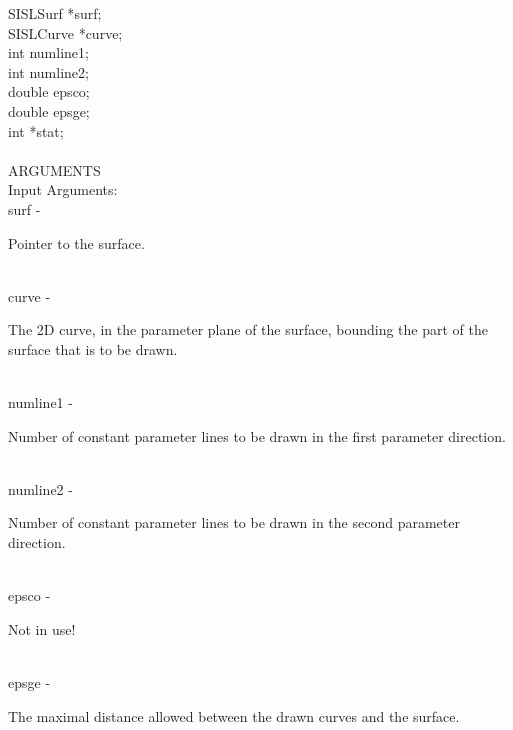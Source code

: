                \>\>    SISLSurf        \>      *{\fov surf};\\
                \>\>    SISLCurve       \>      *{\fov curve};\\
                \>\>    int     \>      {\fov numline1};\\
                \>\>    int     \>      {\fov numline2};\\
                \>\>    double  \>      {\fov epsco};\\
                \>\>    double  \>      {\fov epsge};\\
                \>\>    int     \>      *{\fov stat};\\
\\
ARGUMENTS\\
        \>Input Arguments:\\
        \>\>    {\fov surf}\> - \>      \begin{minipg2}
                                Pointer to the surface.
                                \end{minipg2}\\
        \>\>    {\fov curve}\> - \>     \begin{minipg2}
                                The 2D curve, in the parameter plane of
                                the surface, bounding the part of the
                                surface that is to be drawn.
                                \end{minipg2}\\[0.8ex]
        \>\>    {\fov numline1}\> - \>  \begin{minipg2}
                                Number of constant parameter lines to be drawn in the first
                                parameter direction.
                                \end{minipg2}\\[0.3ex]
        \>\>    {\fov numline2}\> - \>  \begin{minipg2}
                                Number of constant parameter lines to be drawn in the
                                second parameter direction.
                                \end{minipg2} \\[0.3ex]
        \>\>    {\fov epsco}\> - \>     \begin{minipg2}
                                Not in use!
                                \end{minipg2}\\
        \>\>    {\fov epsge}\> - \>     \begin{minipg2}
                                The maximal distance allowed between the drawn curves
                                and the surface.
                                \end{minipg2}\\[0.8ex]
